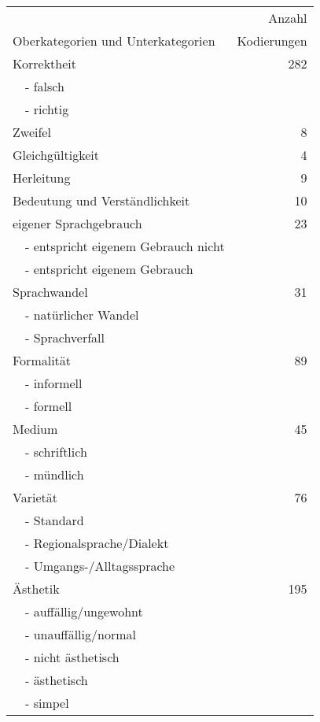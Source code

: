 \begin{table}
\small
\begin{tabular}{llr}
\lsptoprule
               &                                       & Anzahl\\
\multicolumn{2}{l}{Oberkategorien und Unterkategorien} & Kodierungen \\\midrule
\multicolumn{2}{l}{Korrektheit} & 282 \\ %
\textbf{} & - falsch &  \\ 
\textbf{} & - richtig &  \\ 
\multicolumn{2}{l}{Zweifel} & 8 \\ 
\multicolumn{2}{l}{Gleichgültigkeit} & 4 \\ \multicolumn{2}{l}{Herleitung} & 9 \\ 
\multicolumn{2}{l}{Bedeutung und Verständlichkeit} & 10 \\ 
\multicolumn{2}{l}{eigener Sprachgebrauch} & 23 \\ %
\textbf{} & - entspricht eigenem Gebrauch nicht &  \\ 
\textbf{} & - entspricht eigenem Gebrauch &  \\ 
\multicolumn{2}{l}{Sprachwandel} & 31 \\ %
\textbf{} & - natürlicher Wandel &  \\ 
\textbf{} & - Sprachverfall &  \\ 
\multicolumn{2}{l}{Formalität} & 89 \\ %
\textbf{} & - informell &  \\ 
\textbf{} & - formell &  \\ 
\multicolumn{2}{l}{Medium} & 45 \\ %
\textbf{} & - schriftlich &  \\ 
\textbf{} & - mündlich &  \\ 
\multicolumn{2}{l}{Varietät} & 76 \\ %
\textbf{} & - Standard &  \\ 
\textbf{} & - Regionalsprache/Dialekt &  \\ 
\textbf{} & - Umgangs-/Alltagssprache &  \\ 
\multicolumn{2}{l}{Ästhetik} & 195 \\ %
\textbf{} & - auffällig/ungewohnt &  \\ 
\textbf{} & - unauffällig/normal &  \\ 
\textbf{} & - nicht ästhetisch &  \\ 
\textbf{} & - ästhetisch &  \\ 
\textbf{} & - simpel &  \\ 

\end{tabular}
\end{table}
